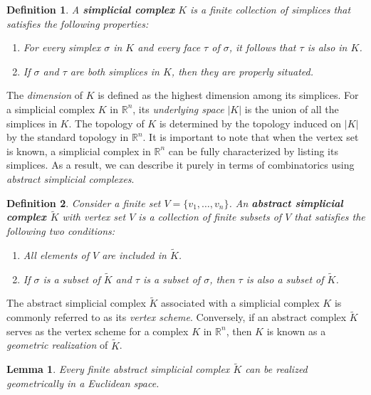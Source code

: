 \documentclass{article}
\newtheorem*{definition}{Definition}
\newtheorem*{lemma}{Lemma}
\begin{document}
\begin{definition}
A \textbf{simplicial complex} $K$ is a finite collection of simplices that satisfies the following properties:
\begin{enumerate}
	\item For every simplex $\sigma$ in $K$ and every face $\tau$ of $\sigma$, it follows that $\tau$ is also in $K$.
	\item If $\sigma$ and $\tau$ are both simplices in $K$, then they are properly situated.
\end{enumerate}
\end{definition}

The \emph{dimension} of $K$ is defined as the highest dimension among its simplices. For a simplicial complex $K$ in $\mathbb{R}^n$, its \emph{underlying space} $\vert K \vert$ is the union of all the simplices in $K$. The topology of $K$ is determined by the topology induced on $\vert K \vert$ by the standard topology in $\mathbb{R}^n$. It is important to note that when the vertex set is known, a simplicial complex in $\mathbb{R}^n$ can be fully characterized by listing its simplices. As a result, we can describe it purely in terms of combinatorics using \emph{abstract simplicial complexes}.

\begin{definition}
Consider a finite set $V = \{v_1, \ldots, v_n\}$. An \textbf{abstract simplicial complex $\tilde{K}$} with vertex set $V$ is a collection of finite subsets of $V$ that satisfies the following two conditions:
\begin{enumerate}
	\item All elements of $V$ are included in $\tilde{K}$.
	\item If $\sigma$ is a subset of $\tilde{K}$ and $\tau$ is a subset of $\sigma$, then $\tau$ is also a subset of $\tilde{K}$.
\end{enumerate}
\end{definition}

The abstract simplicial complex $\tilde{K}$ associated with a simplicial complex $K$ is commonly referred to as its \emph{vertex scheme}. Conversely, if an abstract complex $\tilde{K}$ serves as the vertex scheme for a complex $K$ in $\mathbb{R}^n$, then $K$ is known as a \emph{geometric realization} of $\tilde{K}$.

\begin{lemma}
Every finite abstract simplicial complex $\tilde{K}$ can be realized geometrically in a Euclidean space.
\end{lemma}
\end{document}

